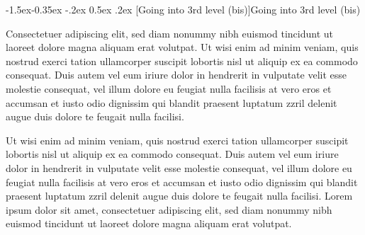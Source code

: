 \documentclass[11pt,twoside]{article}\makeatletter
\makeatletter
\renewcommand\subsubsection{\@startsection{subsubsection}{3}{\z@}%
     {-1.5ex\@plus -0.35ex \@minus -.2ex}%
     {0.5ex \@plus .2ex}%
     {\reset@font\large\sffamily}}
\makeatother
\begin{document}
\subsubsection[{Going into 3rd level (bis)}]{Going into 3rd level (bis)}\par
Consectetuer adipiscing elit, sed diam nonummy nibh euismod tincidunt ut laoreet dolore magna aliquam erat volutpat. Ut wisi enim ad minim veniam, quis nostrud exerci tation ullamcorper suscipit lobortis nisl ut aliquip ex ea commodo consequat. Duis autem vel eum iriure dolor in hendrerit in vulputate velit esse molestie consequat, vel illum dolore eu feugiat nulla facilisis at vero eros et accumsan et iusto odio dignissim qui blandit praesent luptatum zzril delenit augue duis dolore te feugait nulla facilisi.\par
Ut wisi enim ad minim veniam, quis nostrud exerci tation ullamcorper suscipit lobortis nisl ut aliquip ex ea commodo consequat. Duis autem vel eum iriure dolor in hendrerit in vulputate velit esse molestie consequat, vel illum dolore eu feugiat nulla facilisis at vero eros et accumsan et iusto odio dignissim qui blandit praesent luptatum zzril delenit augue duis dolore te feugait nulla facilisi. Lorem ipsum dolor sit amet, consectetuer adipiscing elit, sed diam nonummy nibh euismod tincidunt ut laoreet dolore magna aliquam erat volutpat. 
\end{document}
